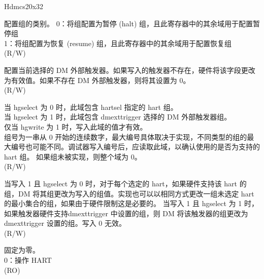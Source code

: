 \begin{register}{H}{dmcs2}{0x32}\label{regdesc:dmcs2}
%
%
%
%
%
%
\regnewline%
\begin{regdesc}\begin{reglist}
\label{fielddesc:grouptype}\item [grouptype] 配置组的类别。
0：将组配置为暂停 (halt) 组，且此寄存器中的其余域用于配置暂停组 \\
1：将组配置为恢复 (resume) 组，且此寄存器中的其余域用于配置恢复组 \\
(R/W)
\label{fielddesc:dmexttrigger}\item [dmexttrigger] 配置当前选择的 DM 外部触发器。如果写入的触发器不存在，硬件将该字段更改为有效值。如果不存在 DM 外部触发器，则将其设置为 0。\\
(R/W)
\label{fielddesc:group}\item [group] 当 hgselect 为 0 时，此域包含 hartsel 指定的 hart 组。\\
当 hgselect 为 1 时，此域包含 dmexttrigger 选择的 DM 外部触发器组。\\
仅当 hgwrite 为 1 时，写入此域的值才有效。\\
组号为一串从 0 开始的连续数字，最大编号具体取决于实现，不同类型的组的最大编号也可能不同。调试器写入编号后，应读取此域，以确认使用的是否为支持的 hart 组。
如果组未被实现，则整个域为 0。\\
(R/W)
\label{fielddesc:hgwrite}\item [hgwrite] 当写入 1 且 hgselect 为 0 时，对于每个选定的 hart，如果硬件支持该 hart 的组，DM 将其组更改为写入的组值。实现也可以以相同方式更改一组未选定 hart 的最小集合的组，如果由于硬件限制这是必要的。
当写入 1 且 hgselect 为 1 时，如果触发器硬件支持dmexttrigger 中设置的组，则 DM 将该触发器的组更改为 dmexttrigger 设置的组。写入 0 无效。\\
(R/W)
\label{fielddesc:hgselect}\item [hgselect] 固定为零。\\
0：操作 HART\\
(RO)
\end{reglist}\end{regdesc}
\end{register}

